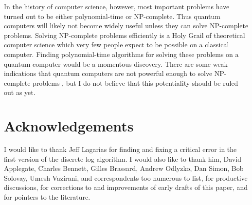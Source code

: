 In the history of computer science, however, most important problems
have turned out to be either polynomial-time or NP-complete.  Thus
quantum computers will likely not become widely useful unless they can 
solve NP-complete problems.  Solving NP-complete problems efficiently
is a Holy Grail of theoretical computer science which very few people expect
to be possible on a classical computer.  Finding polynomial-time algorithms
for solving these problems on a quantum computer would be a momentous
discovery.  There are some weak indications that
quantum computers are not powerful enough to solve NP-complete problems
\cite{BeBeBrVa}, 
but I do not believe that this potentiality should be ruled out as yet.

\section*{Acknowledgements}
I would like to thank Jeff Lagarias for finding and fixing a critical error
in the first version of the discrete log algorithm.  I would also like 
to thank him, David Applegate,
Charles Bennett, Gilles Brassard, Andrew Odlyzko, Dan Simon, 
Bob Solovay, Umesh Vazirani, and correspondents too numerous 
to list, for productive discussions, for corrections to and improvements of 
early drafts of this paper, and for pointers to the literature.

